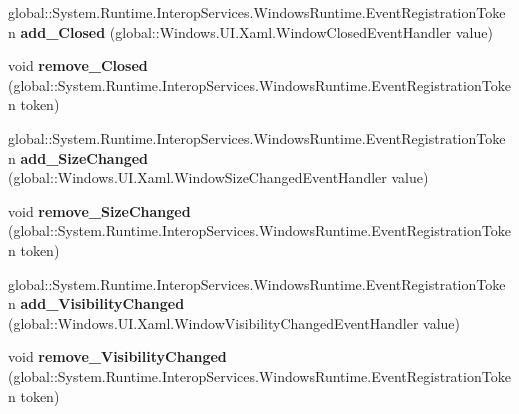 \begin{DoxyCompactItemize}
\item 
\mbox{\label{class_windows_1_1_u_i_1_1_xaml_1_1_window_adb7cdb439992e4bd48b89f73f5654c16}} 
global\+::\+System.\+Runtime.\+Interop\+Services.\+Windows\+Runtime.\+Event\+Registration\+Token {\bfseries add\+\_\+\+Closed} (global\+::\+Windows.\+U\+I.\+Xaml.\+Window\+Closed\+Event\+Handler value)
\item 
\mbox{\label{class_windows_1_1_u_i_1_1_xaml_1_1_window_af4dfd22097abcbe56cc5002bf87ef515}} 
void {\bfseries remove\+\_\+\+Closed} (global\+::\+System.\+Runtime.\+Interop\+Services.\+Windows\+Runtime.\+Event\+Registration\+Token token)
\item 
\mbox{\label{class_windows_1_1_u_i_1_1_xaml_1_1_window_a883a42ba036296bce22db4dd54a0e00b}} 
global\+::\+System.\+Runtime.\+Interop\+Services.\+Windows\+Runtime.\+Event\+Registration\+Token {\bfseries add\+\_\+\+Size\+Changed} (global\+::\+Windows.\+U\+I.\+Xaml.\+Window\+Size\+Changed\+Event\+Handler value)
\item 
\mbox{\label{class_windows_1_1_u_i_1_1_xaml_1_1_window_a5241aefc4f3d8ef6c34cb6aeaef63884}} 
void {\bfseries remove\+\_\+\+Size\+Changed} (global\+::\+System.\+Runtime.\+Interop\+Services.\+Windows\+Runtime.\+Event\+Registration\+Token token)
\item 
\mbox{\label{class_windows_1_1_u_i_1_1_xaml_1_1_window_afb2f2c85c54f1a082f2cdb9cac5b875c}} 
global\+::\+System.\+Runtime.\+Interop\+Services.\+Windows\+Runtime.\+Event\+Registration\+Token {\bfseries add\+\_\+\+Visibility\+Changed} (global\+::\+Windows.\+U\+I.\+Xaml.\+Window\+Visibility\+Changed\+Event\+Handler value)
\item 
\mbox{\label{class_windows_1_1_u_i_1_1_xaml_1_1_window_ad984391809f48d0412161ff575cd570d}} 
void {\bfseries remove\+\_\+\+Visibility\+Changed} (global\+::\+System.\+Runtime.\+Interop\+Services.\+Windows\+Runtime.\+Event\+Registration\+Token token)
\item 
\mbox{\label{class_windows_1_1_u_i_1_1_xaml_1_1_window_a92d7288cb5bc807e56222e347e2e7603}} 

\end{DoxyCompactItemize}
